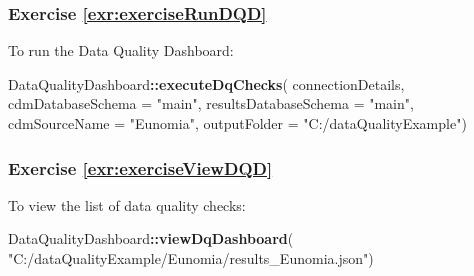 \documentclass[11pt]{book}
\newenvironment{Shaded}{\begin{snugshade}}{\end{snugshade}}
\newcommand{\KeywordTok}[1]{\textcolor[rgb]{0.13,0.29,0.53}{\textbf{#1}}}
\newcommand{\DataTypeTok}[1]{\textcolor[rgb]{0.13,0.29,0.53}{#1}}
\newcommand{\StringTok}[1]{\textcolor[rgb]{0.31,0.60,0.02}{#1}}
\newcommand{\OperatorTok}[1]{\textcolor[rgb]{0.81,0.36,0.00}{\textbf{#1}}}
\newcommand{\NormalTok}[1]{#1}
\theoremstyle{definition}
\theoremstyle{definition}
\theoremstyle{definition}
\theoremstyle{remark}
\begin{document}
\subsubsection*{Exercise
\ref{exr:exerciseRunDQD}}\label{exercise-refexrexerciserundqd}

To run the Data Quality Dashboard:

\begin{Shaded}
\begin{Highlighting}[]
\NormalTok{DataQualityDashboard}\OperatorTok{::}\KeywordTok{executeDqChecks}\NormalTok{(}
\NormalTok{  connectionDetails, }
  \DataTypeTok{cdmDatabaseSchema =} \StringTok{"main"}\NormalTok{, }
  \DataTypeTok{resultsDatabaseSchema =} \StringTok{"main"}\NormalTok{,}
  \DataTypeTok{cdmSourceName =} \StringTok{"Eunomia"}\NormalTok{,}
  \DataTypeTok{outputFolder =} \StringTok{"C:/dataQualityExample"}\NormalTok{) }
\end{Highlighting}
\end{Shaded}

\subsubsection*{Exercise
\ref{exr:exerciseViewDQD}}\label{exercise-refexrexerciseviewdqd}

To view the list of data quality checks:

\begin{Shaded}
\begin{Highlighting}[]
\NormalTok{DataQualityDashboard}\OperatorTok{::}\KeywordTok{viewDqDashboard}\NormalTok{(}
  \StringTok{"C:/dataQualityExample/Eunomia/results_Eunomia.json"}\NormalTok{) }
\end{Highlighting}
\end{Shaded}



\backmatter
\printindex
\end{document}
